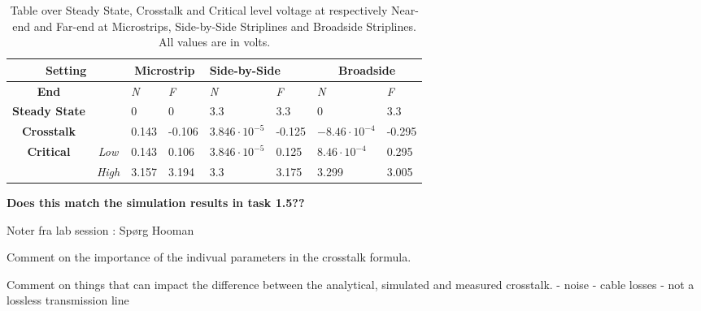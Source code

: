 \documentclass[../main.tex]{subfiles}
\begin{document}
\begin{table}[H]
    \centering
    \begin{tabular}{cl|ll|ll|ll}
    \multicolumn{2}{c|}{\textbf{Setting}}                                   & \multicolumn{2}{c|}{\textbf{Microstrip}} & \multicolumn{2}{l|}{\textbf{\textbf{Side-by-Side}}} & \multicolumn{2}{c}{\textbf{Broadside}}  \\ \hline
    \textbf{End}                       &                                    & \textit{N} & \textit{F}                  & \textit{N}     & \textit{F}                         & \textit{N}               & \textit{F}   \\ \hline
    \textbf{Steady State}              &                                    & 0          & 0                           & 3.3            & 3.3                                & 0                        & 3.3          \\
    \textbf{Crosstalk}                 &                                    & 0.143      & -0.106                      & $3.846 \cdot 10^{-5}$ & -0.125                      & $-8.46\cdot 10^{-4}$     & -0.295       \\
    \multirow{2}{*}{\textbf{Critical}} & \multicolumn{1}{c|}{\textit{Low}}  & 0.143      & 0.106                       & $3.846 \cdot 10^{-5}$ & 0.125                       & $8.46\cdot 10^{-4}$     & 0.295         \\
                                       & \multicolumn{1}{c|}{\textit{High}} & 3.157      & 3.194                       & 3.3            & 3.175                              & 3.299                    & 3.005                  
    \end{tabular}
    \caption{Table over Steady State, Crosstalk and Critical level voltage at respectively Near-end and Far-end at Microstrips, Side-by-Side Striplines and Broadside Striplines. All values are in volts.}
\label{tab:crosstalk_results}
\end{table}

\textbf{Does this match the simulation results in task 1.5??}

 
\vspace{10pt}

Noter fra lab session : Spørg Hooman

Comment on the importance of the indivual parameters in the crosstalk formula.

\vspace{10pt}

Comment on things that can impact the difference between the analytical, simulated and measured crosstalk.
- noise
- cable losses
- not a lossless transmission line
\end{document}

